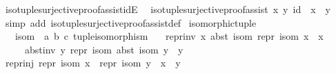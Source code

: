 \begin{isabellebody}
\endisatagproof
{\isafoldproof}%
%
\isadelimproof
\isanewline
%
\endisadelimproof
\isanewline
{}\isamarkupfalse%
\ iso{\isacharunderscore}{\kern0pt}tuple{\isacharunderscore}{\kern0pt}surjective{\isacharunderscore}{\kern0pt}proof{\isacharunderscore}{\kern0pt}assist{\isacharunderscore}{\kern0pt}idE{\isacharcolon}{\kern0pt}\isanewline
\ \ {\isachardoublequoteopen}iso{\isacharunderscore}{\kern0pt}tuple{\isacharunderscore}{\kern0pt}surjective{\isacharunderscore}{\kern0pt}proof{\isacharunderscore}{\kern0pt}assist\ x\ y\ id\ {\isasymLongrightarrow}\ x\ {\isacharequal}{\kern0pt}\ y{\isachardoublequoteclose}\isanewline
%
\isadelimproof
\ \ %
\endisadelimproof
%
\isatagproof
{}\isamarkupfalse%
\ {\isacharparenleft}{\kern0pt}simp\ add{\isacharcolon}{\kern0pt}\ iso{\isacharunderscore}{\kern0pt}tuple{\isacharunderscore}{\kern0pt}surjective{\isacharunderscore}{\kern0pt}proof{\isacharunderscore}{\kern0pt}assist{\isacharunderscore}{\kern0pt}def{\isacharparenright}{\kern0pt}%
\endisatagproof
{\isafoldproof}%
%
\isadelimproof
\isanewline
%
\endisadelimproof
\isanewline
{}\isamarkupfalse%
\ isomorphic{\isacharunderscore}{\kern0pt}tuple\ {\isacharequal}{\kern0pt}\isanewline
\ \ \ isom\ {\isacharcolon}{\kern0pt}{\isacharcolon}{\kern0pt}\ {\isachardoublequoteopen}{\isacharparenleft}{\kern0pt}{\isacharprime}{\kern0pt}a{\isacharcomma}{\kern0pt}\ {\isacharprime}{\kern0pt}b{\isacharcomma}{\kern0pt}\ {\isacharprime}{\kern0pt}c{\isacharparenright}{\kern0pt}\ tuple{\isacharunderscore}{\kern0pt}isomorphism{\isachardoublequoteclose}\isanewline
\ \ \ repr{\isacharunderscore}{\kern0pt}inv{\isacharcolon}{\kern0pt}\ {\isachardoublequoteopen}{\isasymAnd}x{\isachardot}{\kern0pt}\ abst\ isom\ {\isacharparenleft}{\kern0pt}repr\ isom\ x{\isacharparenright}{\kern0pt}\ {\isacharequal}{\kern0pt}\ x{\isachardoublequoteclose}\isanewline
\ \ \ \ \ abst{\isacharunderscore}{\kern0pt}inv{\isacharcolon}{\kern0pt}\ {\isachardoublequoteopen}{\isasymAnd}y{\isachardot}{\kern0pt}\ repr\ isom\ {\isacharparenleft}{\kern0pt}abst\ isom\ y{\isacharparenright}{\kern0pt}\ {\isacharequal}{\kern0pt}\ y{\isachardoublequoteclose}\isanewline
{}\isanewline
\isanewline
{}\isamarkupfalse%
\ repr{\isacharunderscore}{\kern0pt}inj{\isacharcolon}{\kern0pt}\ {\isachardoublequoteopen}repr\ isom\ x\ {\isacharequal}{\kern0pt}\ repr\ isom\ y\ {\isasymlongleftrightarrow}\ x\ {\isacharequal}{\kern0pt}\ y{\isachardoublequoteclose}\isanewline
%
\isadelimproof
\ \ %
\endisadelimproof
%
\isatagproof
{}\isamarkupfalse%

\end{isabellebody}
